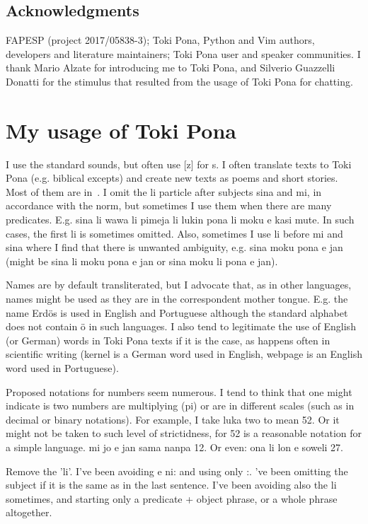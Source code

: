 \documentclass{article}
\begin{document}
\subsection*{Acknowledgments}
FAPESP (project 2017/05838-3);
Toki Pona, Python and Vim authors, developers and literature maintainers;
Toki Pona user and speaker communities. 
I thank Mario Alzate for introducing me to Toki Pona,
and Silverio Guazzelli Donatti for the stimulus that resulted
from the usage of Toki Pona for chatting.

\appendix
\section{My usage of Toki Pona}\label{mytoki}
I use the standard sounds, but often use [z] for s.
I often translate texts to Toki Pona (e.g. biblical excepts)
and create new texts as poems and short stories.
Most of them are in~\cite{tokisona}.
I omit the li particle after subjects sina and mi,
in accordance with the norm,
but sometimes I use them when there are many predicates.
E.g. sina li wawa li pimeja li lukin pona li moku e kasi mute.
In such cases, the first li is sometimes omitted.
Also, sometimes I use li before mi and sina where I find
that there is unwanted ambiguity, e.g.
sina moku pona e jan 
(might be sina li moku pona e jan or sina moku li pona e jan).

Names are by default transliterated,
but I advocate that, as in other languages,
names might be used as they are in the
correspondent mother tongue.
E.g. the name Erdös is used in
English and Portuguese although the standard
alphabet does not contain ö in such languages.
I also tend to legitimate the use of English (or German) words
in Toki Pona texts if it is the case,
as happens often in scientific writing
(kernel is a German word used in English,
webpage is an English word used in Portuguese).

Proposed notations for numbers seem numerous.
I tend to think that one might indicate is two numbers
are multiplying (pi) or are in different scales
(such as in decimal or binary notations).
For example, I take luka two to mean 52.
Or it might not be taken to such level of strictidness,
for 52 is a reasonable notation for a simple language.
mi jo e jan sama nanpa 12.
Or even:
ona li lon e soweli 27.

Remove the 'li'.
I've been avoiding e ni: and using only :.
've been omitting the subject if it is the
same as in the last sentence.
I've been avoiding also the li sometimes,
and starting only a predicate + object phrase,
or a whole phrase altogether.
\end{document}
